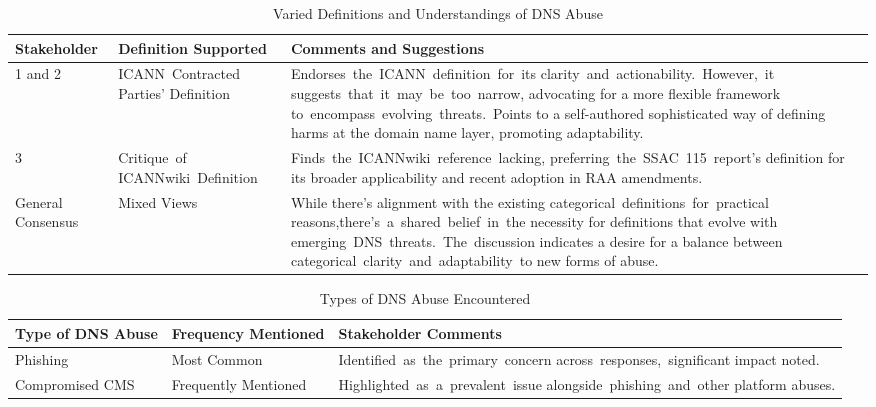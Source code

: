 {
\begin{table}[H]
\centering
\footnotesize 
\begin{tabular}{|p{3cm}|p{3cm}|p{6cm}|}
\hline
\textbf{Stakeholder} & \textbf{Definition Supported} & \textbf{Comments and Suggestions} \\
\hline
1 and 2 & \mbox {ICANN Contracted} Parties' Definition & \mbox {Endorses the ICANN definition for its} \mbox {clarity and actionability. However, it} \mbox {suggests that it may be too narrow,} advocating for a more flexible framework \mbox {to encompass evolving threats. Points} to a self-authored sophisticated way of defining harms at the domain name layer, promoting adaptability. \\
\hline
 3 & \mbox {Critique of} \mbox {ICANNwiki Definition} & \mbox {Finds the ICANNwiki reference lacking}, \mbox {preferring the SSAC 115 report's} definition for its broader applicability and recent adoption in RAA amendments. \\
\hline
General Consensus & Mixed Views & While there's alignment with the existing \mbox {categorical definitions for practical} \mbox {reasons,there's a shared belief in the} necessity for definitions that evolve with \mbox {emerging DNS threats. The discussion} indicates a desire for a balance between \mbox {categorical clarity and adaptability to} new forms of abuse. \\
\hline
\end{tabular}
\caption{Varied Definitions and Understandings of DNS Abuse}
\label{table:dns_abuse_definitions}
\end{table}
}

{
\begin{table}[H]
\centering
\footnotesize 
\begin{tabular}{|l|l|p{5cm}|}
\hline
\textbf{Type of DNS Abuse} & \textbf{Frequency Mentioned} & \textbf{Stakeholder Comments} \\
\hline
Phishing & Most Common & \mbox {Identified as the primary concern} \mbox {across responses, significant} impact noted. \\
\hline
Compromised CMS & Frequently Mentioned & \mbox {Highlighted as a prevalent issue} \mbox {alongside phishing and other} platform abuses. \\
\hline
\end{tabular}
\caption{Types of DNS Abuse Encountered}
\label{table:types_of_dns_abuse}
\end{table}
}

